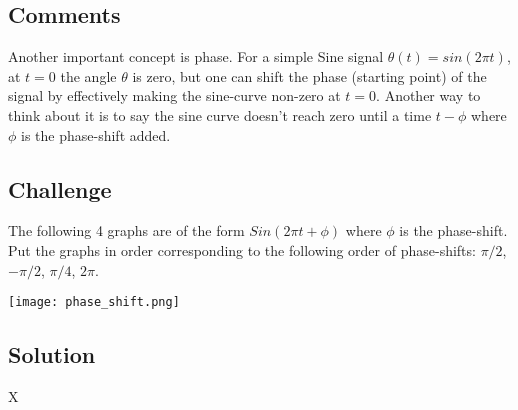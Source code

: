 \subsection*{Comments}
Another important concept is phase. For a simple Sine signal $\theta(t) = sin(2 \pi t)$, at $t=0$ the angle $\theta$ is zero, but one can shift the phase (starting point) of the signal by effectively making the sine-curve non-zero at $t=0$. Another way to think about it is to say the sine curve doesn't reach zero until a time $t-\phi$ where $\phi$ is the phase-shift added.

\subsection*{Challenge}

The following 4 graphs are of the form $Sin(2 \pi t + \phi)$ where $\phi$ is the phase-shift. Put the graphs in order corresponding to the following order of phase-shifts: $\pi/2$, $-\pi/2$, $\pi/4$, $2 \pi$.

\texttt{[image: phase\_shift.png]}

\subsection*{Solution}
X


\timebox
